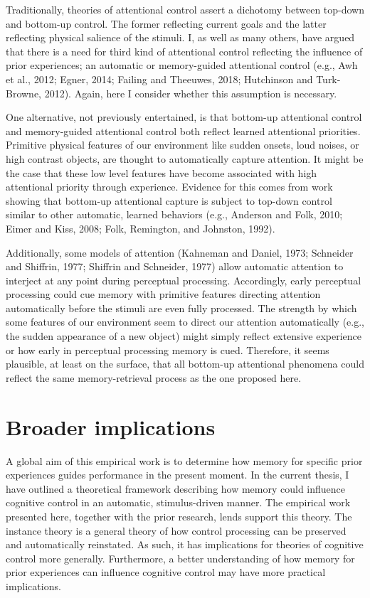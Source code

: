 \documentclass[]{DissertateCUNY}
\begin{document}
Traditionally, theories of attentional control assert a dichotomy
between top-down and bottom-up control. The former reflecting current
goals and the latter reflecting physical salience of the stimuli. I, as
well as many others, have argued that there is a need for third kind of
attentional control reflecting the influence of prior experiences; an
automatic or memory-guided attentional control (e.g., Awh et al., 2012;
Egner, 2014; Failing and Theeuwes, 2018; Hutchinson and Turk-Browne,
2012). Again, here I consider whether this assumption is necessary.

One alternative, not previously entertained, is that bottom-up
attentional control and memory-guided attentional control both reflect
learned attentional priorities. Primitive physical features of our
environment like sudden onsets, loud noises, or high contrast objects,
are thought to automatically capture attention. It might be the case
that these low level features have become associated with high
attentional priority through experience. Evidence for this comes from
work showing that bottom-up attentional capture is subject to top-down
control similar to other automatic, learned behaviors (e.g., Anderson
and Folk, 2010; Eimer and Kiss, 2008; Folk, Remington, and Johnston,
1992).

Additionally, some models of attention (Kahneman and Daniel, 1973;
Schneider and Shiffrin, 1977; Shiffrin and Schneider, 1977) allow
automatic attention to interject at any point during perceptual
processing. Accordingly, early perceptual processing could cue memory
with primitive features directing attention automatically before the
stimuli are even fully processed. The strength by which some features of
our environment seem to direct our attention automatically (e.g., the
sudden appearance of a new object) might simply reflect extensive
experience or how early in perceptual processing memory is cued.
Therefore, it seems plausible, at least on the surface, that all
bottom-up attentional phenomena could reflect the same memory-retrieval
process as the one proposed here.

\hypertarget{broader-implications-1}{%
\section{Broader implications}\label{broader-implications-1}}

A global aim of this empirical work is to determine how memory for
specific prior experiences guides performance in the present moment. In
the current thesis, I have outlined a theoretical framework describing
how memory could influence cognitive control in an automatic,
stimulus-driven manner. The empirical work presented here, together with
the prior research, lends support this theory. The instance theory is a
general theory of how control processing can be preserved and
automatically reinstated. As such, it has implications for theories of
cognitive control more generally. Furthermore, a better understanding of
how memory for prior experiences can influence cognitive control may
have more practical implications.
\end{document}
